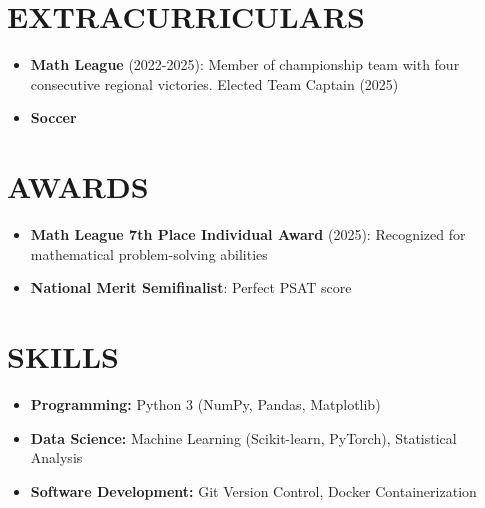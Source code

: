 \documentclass[11pt,letterpaper]{article}
\begin{document}
\vspace{1em}
\section{EXTRACURRICULARS}

\vspace{0.5em}
\begin{itemize}[leftmargin=*,nosep]
  \item \textbf{Math League} (2022-2025): Member of championship team with four consecutive regional victories. Elected Team Captain (2025)
  \item \textbf{Soccer}
\end{itemize}

\vspace{1em}
\section{AWARDS}

\vspace{0.5em}
\begin{itemize}[leftmargin=*,nosep]
  \item \textbf{Math League 7th Place Individual Award} (2025): Recognized for mathematical problem-solving abilities
  \item \textbf{National Merit Semifinalist}: Perfect PSAT score 
\end{itemize}

\vspace{1em}
\section{SKILLS}

\vspace{0.5em}
\begin{itemize}[leftmargin=*,nosep]
  \item \textbf{Programming:} Python 3 (NumPy, Pandas, Matplotlib)
  \item \textbf{Data Science:} Machine Learning (Scikit-learn, PyTorch), Statistical Analysis
  \item \textbf{Software Development:} Git Version Control, Docker Containerization
\end{itemize}
\end{document}
